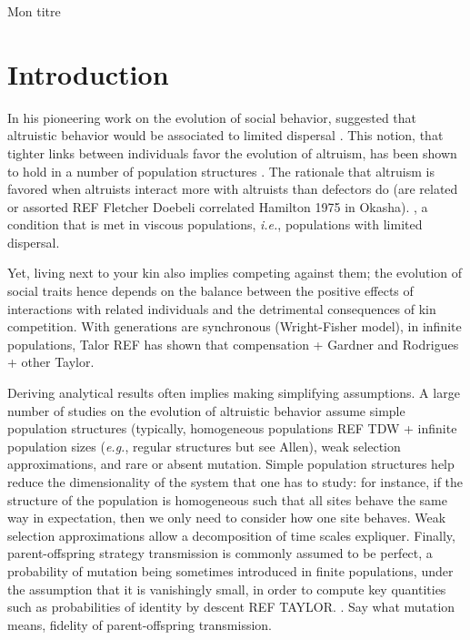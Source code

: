\documentclass[11pt, letterpaper]{article}
\newcommand{\ie}{\textit{i.\!e.\!}}
\newcommand{\eg}{\textit{e.\!g.\!}}
\begin{document}
Mon titre 
\clearpage
\linenumbers
\section{Introduction}
In his pioneering work on the evolution of social behavior, \citeauthor{Hamilton1964} suggested that altruistic behavior would be associated to limited dispersal \citep[p.10]{Hamilton1964}. This notion, that tighter links between individuals favor the evolution of altruism, has been shown to hold in a number of population structures  \citep[see \eg][]{Ohtsuki2006,TaylorDayWild2007, Lehmann2007}. The rationale that altruism is favored when altruists interact more with altruists than defectors do (are related or assorted REF Fletcher Doebeli correlated Hamilton 1975 in Okasha).
, a condition that is met in viscous populations, \ie, populations with limited dispersal.

Yet, living next to your kin also implies competing against them; the evolution of social traits hence depends on the balance between the positive effects of interactions with related individuals and the detrimental consequences of kin competition. With generations are synchronous (Wright-Fisher model), in infinite populations, Talor REF has shown that compensation + Gardner and Rodrigues + other Taylor.

Deriving analytical results often implies making simplifying assumptions. A large number of studies on the evolution of altruistic behavior assume simple population structures (typically, homogeneous populations REF TDW + infinite population sizes (\eg, regular structures but see Allen), weak selection approximations, and rare or absent mutation. Simple population structures help reduce the dimensionality of the system that one has to study: for instance, if the structure of the population is homogeneous such that all sites behave the same way in expectation, then we only need to consider how one site behaves. Weak selection approximations allow a decomposition of time scales expliquer. Finally, parent-offspring strategy transmission is commonly assumed to be perfect, a probability of mutation being sometimes introduced in finite populations, under the assumption that it is vanishingly small, in order to compute key quantities such as probabilities of identity by descent REF TAYLOR. . 
Say what mutation means, fidelity of parent-offspring transmission. 
\end{document}
